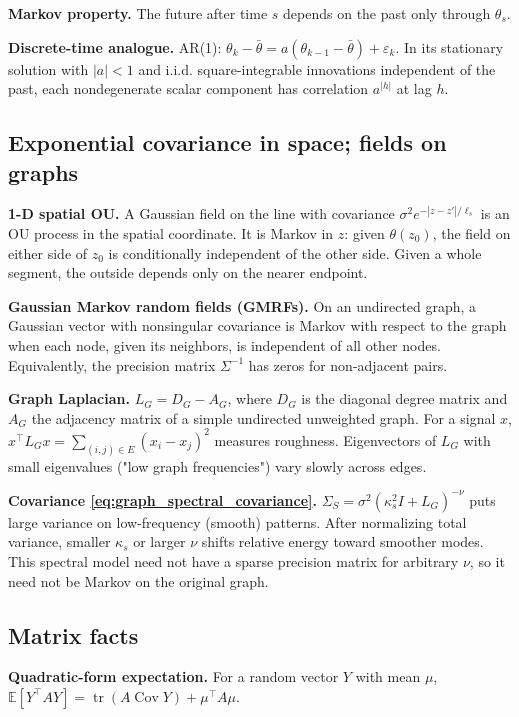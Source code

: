 \textbf{Markov property.} The future after time $s$ depends on the past only through $\theta_s$.

\textbf{Discrete-time analogue.} AR(1): $\theta_k-\bar\theta=a(\theta_{k-1}-\bar\theta)+\varepsilon_k$. In its stationary solution with $|a|<1$ and i.i.d. square-integrable
innovations independent of the past, each nondegenerate scalar component
has correlation $a^{|h|}$ at lag $h$.

\subsection{Exponential covariance in space; fields on graphs}
\label{app:toolkit-5}
\textbf{1-D spatial OU.} A Gaussian field on the line with covariance $\sigma^2e^{-|z-z'|/\ell_s}$ is an OU process in the spatial coordinate. It is Markov in $z$: given $\theta(z_0)$, the field on either side of $z_0$ is conditionally independent of the other side. Given a whole segment, the outside depends only on the nearer endpoint.

\textbf{Gaussian Markov random fields (GMRFs).} On an undirected graph, a Gaussian vector with nonsingular covariance is Markov with respect to the graph when each node, given its neighbors, is independent of all other nodes. Equivalently, the precision matrix $\Sigma^{-1}$ has zeros for non-adjacent pairs.

\textbf{Graph Laplacian.} $L_G=D_G-A_G$, where $D_G$ is the diagonal degree matrix and $A_G$ the adjacency
matrix of a simple undirected unweighted graph. For a signal $x$, $x^\top L_Gx=\sum_{(i,j)\in E}(x_i-x_j)^2$ measures roughness. Eigenvectors of $L_G$ with small eigenvalues ("low graph frequencies") vary slowly across edges.

\textbf{Covariance \eqref{eq:graph_spectral_covariance}.} $\Sigma_S=\sigma^2(\kappa_s^2I+L_G)^{-\nu}$ puts large variance on low-frequency (smooth) patterns. After normalizing total variance, smaller $\kappa_s$ or larger $\nu$ shifts
relative energy toward smoother modes. This spectral model need not have a
sparse precision matrix for arbitrary $\nu$, so it need not be Markov on
the original graph.

\subsection{Matrix facts}
\label{app:toolkit-6}
\textbf{Quadratic-form expectation.} For a random vector $Y$ with mean $\mu$, $\mathbb E[Y^\top AY]=\operatorname{tr}(A\operatorname{Cov}Y)+\mu^\top A\mu$.

